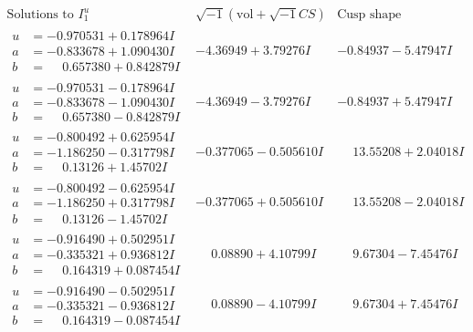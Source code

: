 \documentclass[1p]{elsarticle_modified}
\theoremstyle{definition}
\newcommand{\I}{\sqrt{-1}}
\begin{document}
$$\begin{array}{c|c|c}  
\text{Solutions to }I^u_{1}& \I (\text{vol} + \sqrt{-1}CS) & \text{Cusp shape}\\
 \hline 
\begin{aligned}
u &= -0.970531 + 0.178964 I \\
a &= -0.833678 + 1.090430 I \\
b &= \phantom{-}0.657380 + 0.842879 I\end{aligned}
 & -4.36949 + 3.79276 I & -0.84937 - 5.47947 I \\ \hline\begin{aligned}
u &= -0.970531 - 0.178964 I \\
a &= -0.833678 - 1.090430 I \\
b &= \phantom{-}0.657380 - 0.842879 I\end{aligned}
 & -4.36949 - 3.79276 I & -0.84937 + 5.47947 I \\ \hline\begin{aligned}
u &= -0.800492 + 0.625954 I \\
a &= -1.186250 - 0.317798 I \\
b &= \phantom{-}0.13126 + 1.45702 I\end{aligned}
 & -0.377065 - 0.505610 I & \phantom{-}13.55208 + 2.04018 I \\ \hline\begin{aligned}
u &= -0.800492 - 0.625954 I \\
a &= -1.186250 + 0.317798 I \\
b &= \phantom{-}0.13126 - 1.45702 I\end{aligned}
 & -0.377065 + 0.505610 I & \phantom{-}13.55208 - 2.04018 I \\ \hline\begin{aligned}
u &= -0.916490 + 0.502951 I \\
a &= -0.335321 + 0.936812 I \\
b &= \phantom{-}0.164319 + 0.087454 I\end{aligned}
 & \phantom{-}0.08890 + 4.10799 I & \phantom{-}9.67304 - 7.45476 I \\ \hline\begin{aligned}
u &= -0.916490 - 0.502951 I \\
a &= -0.335321 - 0.936812 I \\
b &= \phantom{-}0.164319 - 0.087454 I\end{aligned}
 & \phantom{-}0.08890 - 4.10799 I & \phantom{-}9.67304 + 7.45476 I \\ \hline\begin{aligned}

\end{aligned}
\end{array}$$
\end{document}
